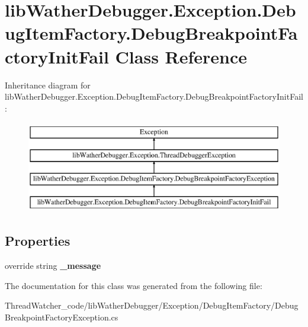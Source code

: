 \hypertarget{classlib_wather_debugger_1_1_exception_1_1_debug_item_factory_1_1_debug_breakpoint_factory_init_fail}{\section{lib\+Wather\+Debugger.\+Exception.\+Debug\+Item\+Factory.\+Debug\+Breakpoint\+Factory\+Init\+Fail Class Reference}
\label{classlib_wather_debugger_1_1_exception_1_1_debug_item_factory_1_1_debug_breakpoint_factory_init_fail}
}
Inheritance diagram for lib\+Wather\+Debugger.\+Exception.\+Debug\+Item\+Factory.\+Debug\+Breakpoint\+Factory\+Init\+Fail\+:\begin{figure}[H]
\begin{center}
\leavevmode
\includegraphics[height=4.000000cm]{classlib_wather_debugger_1_1_exception_1_1_debug_item_factory_1_1_debug_breakpoint_factory_init_fail}
\end{center}
\end{figure}
\subsection*{Properties}
\begin{DoxyCompactItemize}
\item 
\hypertarget{classlib_wather_debugger_1_1_exception_1_1_debug_item_factory_1_1_debug_breakpoint_factory_init_fail_a1963313667666faca52af697facf3c64}{override string {\bfseries \+\_\+message}}\label{classlib_wather_debugger_1_1_exception_1_1_debug_item_factory_1_1_debug_breakpoint_factory_init_fail_a1963313667666faca52af697facf3c64}

\end{DoxyCompactItemize}


The documentation for this class was generated from the following file\+:\begin{DoxyCompactItemize}
\item 
Thread\+Watcher\+\_\+code/lib\+Wather\+Debugger/\+Exception/\+Debug\+Item\+Factory/Debug\+Breakpoint\+Factory\+Exception.\+cs\end{DoxyCompactItemize}
